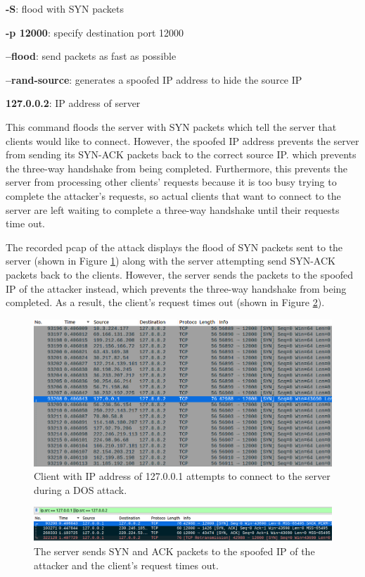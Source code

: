 \documentclass[11pt]{article}
\begin{document}
\textbf{-S}: flood with SYN packets

\textbf{-p 12000}: specify destination port 12000

\textbf{--flood}: send packets as fast as possible

\textbf{--rand-source}: generates a spoofed IP address to hide the source IP

\textbf{127.0.0.2}: IP address of server
\newline

This command floods the server with SYN packets which tell the server that clients would like to connect.
However, the spoofed IP address prevents the server from sending its SYN-ACK packets back to the correct source IP.
which prevents the three-way handshake from being completed.
Furthermore, this prevents the server from processing other clients' requests because it is too busy trying to complete the attacker's requests,
so actual clients that want to connect to the server are left waiting to complete a three-way handshake until their requests time out.
\newline

The recorded pcap of the attack displays the flood of SYN packets sent to the server (shown in Figure \ref{fig:client-attempt-flood})
along with the server attempting send SYN-ACK packets back to the clients.
However, the server sends the packets to the spoofed IP of the attacker instead,
which prevents the three-way handshake from being completed.
As a result, the client's request times out (shown in Figure \ref{fig:filtered-dos}).

\begin{figure}[htbp]
\centering
\includegraphics[width=.9\linewidth]{./client-attempt-flood.png}
\caption{\label{fig:client-attempt-flood}
Client with IP address of 127.0.0.1 attempts to connect to the server during a DOS attack.}
\end{figure}

\begin{figure}[htbp]
\centering
\includegraphics[width=.9\linewidth]{./filtered-dos.png}
\caption{\label{fig:filtered-dos}
The server sends SYN and ACK packets to the spoofed IP of the attacker and the client's request times out.}
\end{figure}
\end{document}

